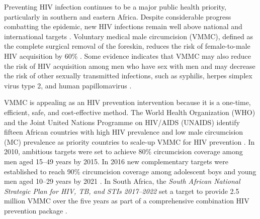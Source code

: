 \documentclass{article}
\begin{document}
Preventing HIV infection continues to be a major public health priority, particularly in southern and eastern Africa. Despite considerable progress combatting the epidemic, new HIV infections remain well above national and international targets \cite{UNAIDSHighLevel}. Voluntary medical male circumcision (VMMC), defined as the complete surgical removal of the foreskin, reduces the risk of female-to-male HIV acquisition by 60\% \cite{gray2007male, bailey2007male, auvert2005randomized, gray2012effectiveness, grund2017association}. Some evidence indicates that VMMC may also reduce the risk of HIV acquisition among men who have sex with men \cite{pintye2019benefits} and may decrease the risk of other sexually transmitted infections, such as syphilis, herpes simplex virus type 2, and human papillomavirus \cite{tobian2009male}.

VMMC is appealing as an HIV prevention intervention because it is a one-time, efficient, safe, and cost-effective method. The World Health Organization (WHO) and the Joint United Nations Programme on HIV/AIDS (UNAIDS) identify fifteen African countries with high HIV prevalence and low male circumcision (MC) prevalence as priority countries to scale-up VMMC for HIV prevention \cite{UNAIDSJoint, davis2018progress, WHOVoluntary2}. In 2010, ambitious targets were set to achieve 80\% circumcision coverage among men aged 15--49 years by 2015. In 2016 new complementary targets were established to reach 90\% circumcision coverage among adolescent boys and young men aged 10--29 years by 2021  \cite{WHOFramework}. In South Africa, the \textit{South African National Strategic Plan for HIV, TB, and STIs 2017--2022} set a target to provide 2.5 million VMMC over the five years as part of a comprehensive combination HIV prevention package \cite{sanac}.
\end{document}
